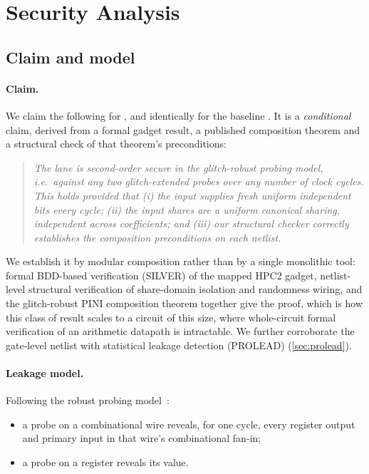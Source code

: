 \section{Security Analysis}\label{sec:security}

\subsection{Claim and model}
\paragraph{Claim.} We claim the following for , and identically for the baseline . It is a \emph{conditional} claim, derived from a formal gadget result, a published composition theorem and a structural check of that theorem's preconditions:
\begin{quote}\itshape
The lane is second-order secure in the glitch-robust probing model, i.e.\ against any two glitch-extended probes over any number of clock cycles. This holds provided that (i) the  input supplies fresh uniform independent bits every cycle; (ii) the input shares are a uniform canonical sharing, independent across coefficients; and (iii) our structural checker correctly establishes the composition preconditions on each netlist.
\end{quote}
We establish it by modular composition rather than by a single monolithic tool: formal BDD-based verification (SILVER) of the mapped HPC2 gadget, netlist-level structural verification of share-domain isolation and randomness wiring, and the glitch-robust PINI composition theorem together give the proof, which is how this class of result scales to a circuit of this size, where whole-circuit formal verification of an arithmetic datapath is intractable. We further corroborate the gate-level netlist with statistical leakage detection (PROLEAD) (\cref{sec:prolead}).

\paragraph{Leakage model.} Following the robust probing model~\cite{faust2018,cassiers2021hpc}:
\begin{itemize}
  \item a probe on a combinational wire reveals, for one cycle, every register output and primary input in that wire's combinational fan-in;
  \item a probe on a register reveals its value.
\end{itemize}

